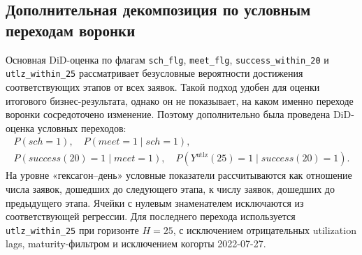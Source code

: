 \documentclass[14pt,a4paper]{extarticle}
\begin{document}
\subsection{Дополнительная декомпозиция по условным переходам воронки}
Основная DiD-оценка по флагам \texttt{sch\_flg}, \texttt{meet\_flg}, \texttt{success\_within\_20} и \texttt{utlz\_within\_25} рассматривает безусловные вероятности достижения соответствующих этапов от всех заявок. Такой подход удобен для оценки итогового бизнес-результата, однако он не показывает, на каком именно переходе воронки сосредоточено изменение. Поэтому дополнительно была проведена DiD-оценка условных переходов:
\begin{multline*}
P(sch=1),\quad
P(meet=1 \mid sch=1),\\
P(success(20)=1 \mid meet=1),\quad
P\!\left(Y^{\mathrm{utlz}}(25)=1 \mid success(20)=1\right).
\end{multline*}
На уровне «гексагон--день» условные показатели рассчитываются как отношение числа заявок, дошедших до следующего этапа, к числу заявок, дошедших до предыдущего этапа. Ячейки с нулевым знаменателем исключаются из соответствующей регрессии. Для последнего перехода используется \texttt{utlz\_within\_25} при горизонте \(H=25\), с исключением отрицательных utilization lags, maturity-фильтром и исключением когорты 2022-07-27.
\end{document}
